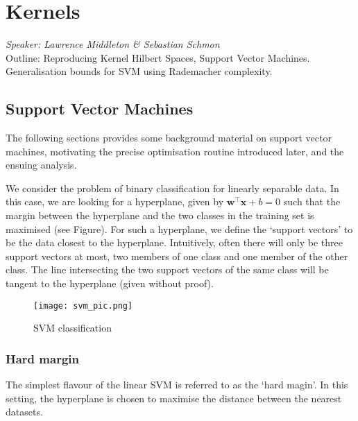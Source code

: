 
\chapter{Kernels}
\emph{Speaker: Lawrence Middleton \& Sebastian Schmon}\\

Outline: Reproducing Kernel Hilbert Spaces, Support Vector Machines. Generalisation bounds for SVM using Rademacher complexity.

\section{Support Vector Machines}
The following sections provides some background material on support vector machines, motivating the precise optimisation routine introduced later, and the ensuing analysis.

We consider the problem of binary classification for linearly separable data. In this case, we are looking for a hyperplane, given by $\mathbf{w}^\top\mathbf{x}+b=0$ such that the margin between the hyperplane and the two classes in the training set is maximised (see Figure). For such a hyperplane, we define the `support vectors' to be the data closest to the hyperplane. Intuitively, often there will only be three support vectors at most, two members of one class and one member of the other class. The line intersecting the two support vectors of the same class will be tangent to the hyperplane (given without proof).
\begin{figure}
\center
\texttt{[image: svm\_pic.png]}
\caption{SVM classification}
\end{figure}

\subsection{Hard margin}
The simplest flavour of the linear SVM is referred to as the `hard magin'. In this setting, the hyperplane is chosen to maximise the distance between the nearest datasets.

